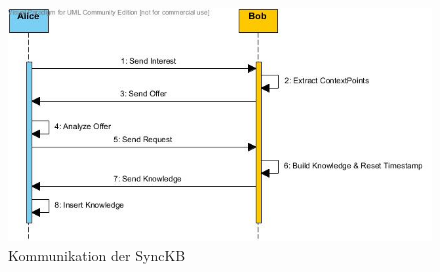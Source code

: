 \documentclass[a4paper]{article}
\begin{document}
	\begin{figure}[H] 
		\includegraphics[width=\linewidth]{../Bilder/sync_seq.jpg}
		\caption{Kommunikation der SyncKB}
		\label{fig:SyncSeq}
	\end{figure}
	
\end{document}
